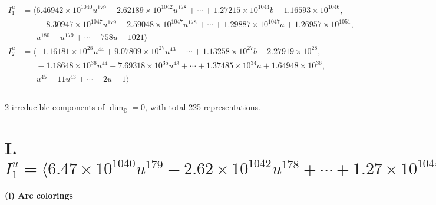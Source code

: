 \documentclass[1p]{elsarticle_modified}
\theoremstyle{definition}
\begin{document}
\begin{align*}
I^u_{1}&=\langle 
6.46942\times10^{1040} u^{179}-2.62189\times10^{1042} u^{178}+\cdots+1.27215\times10^{1044} b-1.16593\times10^{1046},\\
\phantom{I^u_{1}}&\phantom{= \langle  }-8.30947\times10^{1047} u^{179}-2.59048\times10^{1047} u^{178}+\cdots+1.29887\times10^{1047} a+1.26957\times10^{1051},\\
\phantom{I^u_{1}}&\phantom{= \langle  }u^{180}+u^{179}+\cdots-758 u-1021\rangle \\
I^u_{2}&=\langle 
-1.16181\times10^{28} u^{44}+9.07809\times10^{27} u^{43}+\cdots+1.13258\times10^{27} b+2.27919\times10^{28},\\
\phantom{I^u_{2}}&\phantom{= \langle  }-1.18648\times10^{36} u^{44}+7.69318\times10^{35} u^{43}+\cdots+1.37485\times10^{34} a+1.64948\times10^{36},\\
\phantom{I^u_{2}}&\phantom{= \langle  }u^{45}-11 u^{43}+\cdots+2 u-1\rangle \\
\\
\end{align*}
\raggedright * 2 irreducible components of $\dim_{\mathbb{C}}=0$, with total 225 representations.\\
\newpage
\renewcommand{\arraystretch}{1}
\centering \section*{I. $I^u_{1}= \langle 6.47\times10^{1040} u^{179}-2.62\times10^{1042} u^{178}+\cdots+1.27\times10^{1044} b-1.17\times10^{1046},\;-8.31\times10^{1047} u^{179}-2.59\times10^{1047} u^{178}+\cdots+1.30\times10^{1047} a+1.27\times10^{1051},\;u^{180}+u^{179}+\cdots-758 u-1021 \rangle$}
\flushleft \textbf{(i) Arc colorings}\\
\end{document}
